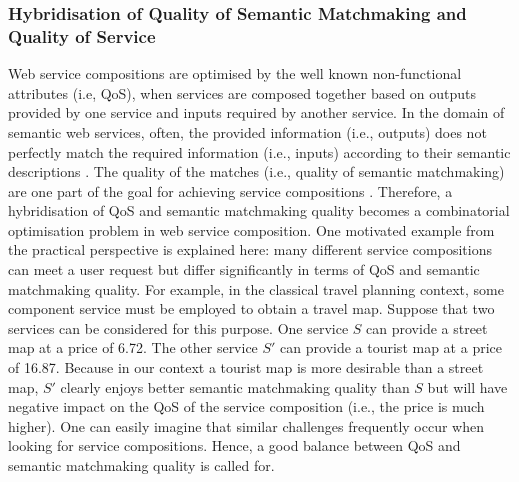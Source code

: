 \subsubsection{Hybridisation of Quality of Semantic Matchmaking and Quality of Service}\label{SC:hybridisation}
Web service compositions are optimised by the well known non-functional attributes (i.e, QoS), when services are composed together based on outputs provided by one service and inputs required by another service. In the domain of semantic web services, often, the provided information (i.e., outputs) does not perfectly match the required information (i.e., inputs) according to their semantic descriptions \cite{lecue2008optimizing}. The quality of the matches (i.e., quality of semantic matchmaking) are one part of the goal for achieving service compositions \cite{lecue2009optimizing}. Therefore, a hybridisation of QoS and semantic matchmaking quality becomes a combinatorial optimisation problem in web service composition. One motivated example from the practical perspective is explained here: many different service compositions can meet a user request but differ significantly in terms of QoS and semantic matchmaking quality. For example, in the classical travel planning context, some component service must be employed to obtain a travel map. Suppose that two services can be considered for this purpose. One service $S$ can provide a street map at a price of 6.72. The other service $S'$ can provide a tourist map at a price of 16.87. Because in our context a tourist map is more desirable than a street map, $S'$ clearly enjoys better semantic matchmaking quality than $S$ but will have negative impact on the QoS of the service composition (i.e., the price is much higher). One can easily imagine that similar challenges frequently occur when looking for service compositions. Hence, a good balance between QoS and semantic matchmaking quality is called for.

